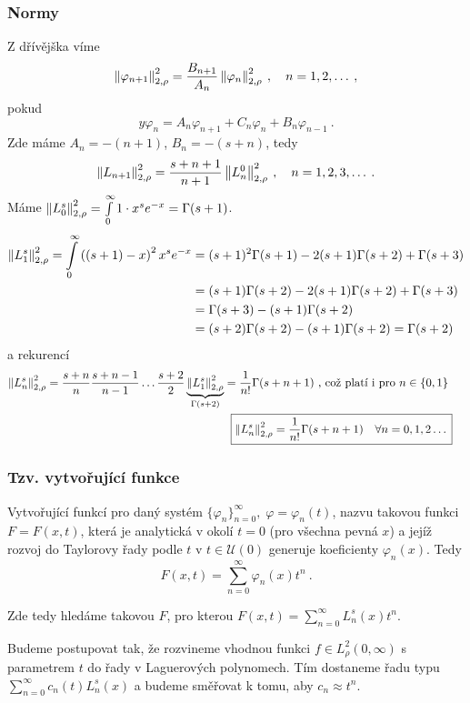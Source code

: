 \subsubsection{Normy}
Z dřívějška víme
$$\left\lVert\varphi_{n+1}\right\rVert_{2,\rho}^2 = \frac{B_{n+1}}{A_n}\left\lVert\varphi_n\right\rVert_{2,\rho}^2\:, \quad n=1,2,\dots\:,$$
pokud  $$y\varphi_n = A_n\varphi_{n+1}+C_n\varphi_n+B_n\varphi_{n-1}\:.$$
Zde máme $A_n=-(n+1)$, $B_n=-(s+n)$, tedy
$$\left\lVert L_{n+1}\right\rVert_{2,\rho}^2 = \frac{s+n+1}{n+1}\left\lVert L_n^0\right\rVert_{2,\rho}^2\:, \quad
 n=1,2,3,\dots\:.$$
 Máme $\left\lVert L_0^s\right\rVert_{2,\rho}^2 = \int\limits_0^\infty 1\cdot x^se^{-x}=\Gamma(s+1)$.
 \begin{align*}
     \left\lVert L_1^s\right\rVert_{2,\rho}^2 = \int\limits_0^\infty\left((s+1)-x\right)^2x^se^{-x} &= (s+1)^2\Gamma(s+1)-2(s+1)\Gamma(s+2)+\Gamma(s+3)\\
     &=(s+1)\Gamma(s+2)-2(s+1)\Gamma(s+2)+\Gamma(s+3)\\
     &=\Gamma(s+3)-(s+1)\Gamma(s+2)\\
     &=(s+2)\Gamma(s+2)-(s+1)\Gamma(s+2) = \Gamma(s+2)
 \end{align*}
a rekurencí
\begin{align*}
    \norm{L_n^s}_{2,\rho}^2=\frac{s+n}{n}\frac{s+n-1}{n-1}\dots \frac{s+2}{2}\underbrace{\norm{L_1^s}_{2,\rho}^2}_{\Gamma(s+2)}=\frac{1}{n!}\Gamma(s+n+1) \text{ , což platí i pro }n\in\{0,1\}\\
    \Aboxed{\norm{L_n^s}_{2,\rho}^2=\frac{1}{n!}\Gamma(s+n+1)\quad \forall n=0,1,2\dots}
\end{align*}


\subsubsection{Tzv. vytvořující funkce}
\begin{definition}
    Vytvořující funkcí pro daný systém $\{\varphi_n\}_{n=0}^\infty,\; \varphi=\varphi_n(t)$, nazvu takovou funkci $F=F(x,t)$, která je analytická v okolí $t=0$ (pro všechna pevná $x$) a jejíž rozvoj do Taylorovy řady podle $t$ v $t\in\mathcal{U}(0)$ generuje koeficienty $\varphi_n(x)$. Tedy
    $$F(x,t)=\sum\limits_{n=0}^\infty\varphi_n(x)t^n\:.$$
\end{definition}

Zde tedy hledáme takovou $F$, pro kterou $F(x,t)=\sum\limits_{n=0}^\infty L_n^s(x)t^n$. 

Budeme postupovat tak, že rozvineme vhodnou funkci $f\in L_\rho^2(0,\infty)$ s parametrem $t$ do řady v Laguerových polynomech. Tím dostaneme řadu typu $\sum_{n=0}^\infty c_n(t)L_n^s(x)$ a budeme směřovat k tomu, aby $c_n\approx t^n$.

